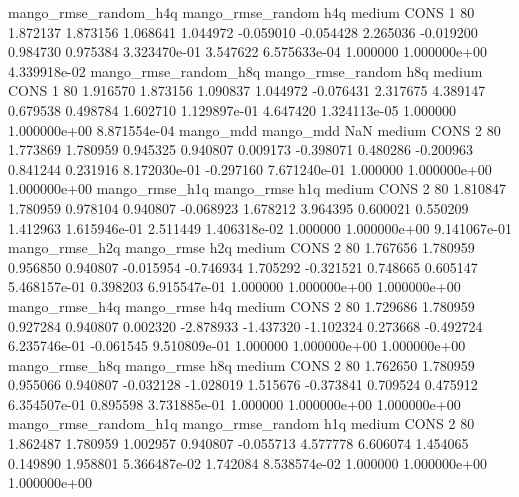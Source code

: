 mango_rmse_random_h4q mango_rmse_random                  h4q     medium     CONS                 1 80  1.872137       1.873156 1.068641       1.044972   -0.059010     -0.054428      2.265036    -0.019200       0.984730  0.975384 3.323470e-01     3.547622   6.575633e-04            1.000000    1.000000e+00        4.339918e-02
mango_rmse_random_h8q mango_rmse_random                  h8q     medium     CONS                 1 80  1.916570       1.873156 1.090837       1.044972   -0.076431      2.317675      4.389147     0.679538       0.498784  1.602710 1.129897e-01     4.647420   1.324113e-05            1.000000    1.000000e+00        8.871554e-04
            mango_mdd         mango_mdd                  NaN     medium     CONS                 2 80  1.773869       1.780959 0.945325       0.940807    0.009173     -0.398071      0.480286    -0.200963       0.841244  0.231916 8.172030e-01    -0.297160   7.671240e-01            1.000000    1.000000e+00        1.000000e+00
       mango_rmse_h1q        mango_rmse                  h1q     medium     CONS                 2 80  1.810847       1.780959 0.978104       0.940807   -0.068923      1.678212      3.964395     0.600021       0.550209  1.412963 1.615946e-01     2.511449   1.406318e-02            1.000000    1.000000e+00        9.141067e-01
       mango_rmse_h2q        mango_rmse                  h2q     medium     CONS                 2 80  1.767656       1.780959 0.956850       0.940807   -0.015954     -0.746934      1.705292    -0.321521       0.748665  0.605147 5.468157e-01     0.398203   6.915547e-01            1.000000    1.000000e+00        1.000000e+00
       mango_rmse_h4q        mango_rmse                  h4q     medium     CONS                 2 80  1.729686       1.780959 0.927284       0.940807    0.002320     -2.878933     -1.437320    -1.102324       0.273668 -0.492724 6.235746e-01    -0.061545   9.510809e-01            1.000000    1.000000e+00        1.000000e+00
       mango_rmse_h8q        mango_rmse                  h8q     medium     CONS                 2 80  1.762650       1.780959 0.955066       0.940807   -0.032128     -1.028019      1.515676    -0.373841       0.709524  0.475912 6.354507e-01     0.895598   3.731885e-01            1.000000    1.000000e+00        1.000000e+00
mango_rmse_random_h1q mango_rmse_random                  h1q     medium     CONS                 2 80  1.862487       1.780959 1.002957       0.940807   -0.055713      4.577778      6.606074     1.454065       0.149890  1.958801 5.366487e-02     1.742084   8.538574e-02            1.000000    1.000000e+00        1.000000e+00
